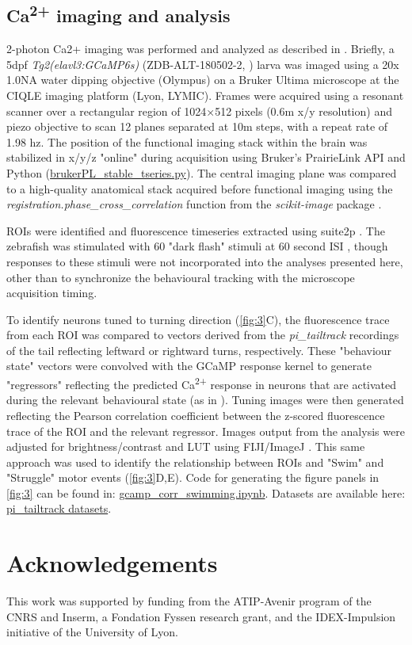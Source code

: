 \documentclass[9pt,lineno]{RandlettLab_elife}
\begin{document}
\subsection{Ca\textsuperscript{2+} imaging and analysis}

2-photon Ca2+ imaging was performed and analyzed as described in \citep{Lamire2023-di}. Briefly, a 5dpf \emph{Tg2(elavl3:GCaMP6s)} (ZDB-ALT-180502-2, \cite{Dunn2016-bg}) larva was imaged using a 20x 1.0NA water dipping objective (Olympus) on a Bruker Ultima microscope at the CIQLE imaging platform (Lyon, LYMIC). Frames were acquired using a resonant scanner over a rectangular region of 1024×512 pixels (0.6\micro m x/y resolution) and piezo objective to scan 12 planes separated at 10\micro m steps, with a repeat rate of 1.98 hz. The position of the functional imaging stack within the brain was stabilized in x/y/z "online" during acquisition using Bruker's PrairieLink API and Python (\href{https://github.com/owenrandlett/pi_tailtrack/blob/main/brukerPL_stable_tseries.py}{brukerPL\_stable\_tseries.py}). The central imaging plane was compared to a high-quality anatomical stack acquired before functional imaging using the \emph{ registration.phase\_cross\_correlation} function from the \emph{scikit-image} package \citep{van2014scikit}. 

ROIs were identified and fluorescence timeseries extracted using suite2p \citep{Pachitariu2016-tl}. The zebrafish was stimulated with 60 "dark flash" stimuli at 60 second ISI \citep{Lamire2023-di}, though responses to these stimuli were not incorporated into the analyses presented here, other than to synchronize the behavioural tracking with the microscope acquisition timing.


To identify neurons tuned to turning direction (\autoref{fig:3}C), the fluorescence trace from each ROI was compared to vectors derived from the \emph{pi\_tailtrack} recordings of the tail reflecting leftward or rightward turns, respectively. These "behaviour state" vectors were convolved with the GCaMP response kernel to generate "regressors" reflecting the predicted Ca\textsuperscript{2+} response in neurons that are activated during the relevant behavioural state (as in \cite{Miri2011-sr}). Tuning images were then generated reflecting the Pearson correlation coefficient between the z-scored fluorescence trace of the ROI and the relevant regressor. Images output from the analysis were adjusted for brightness/contrast and LUT using FIJI/ImageJ \citep{Schindelin2012-hd}. This same approach was used to identify the relationship between ROIs and "Swim" and "Struggle" motor events (\autoref{fig:3}D,E). Code for generating the figure panels in \autoref{fig:3} can be found in: \href{https://github.com/owenrandlett/pi_tailtrack/blob/main/gcamp_corr_swimming.ipynb}{gcamp\_corr\_swimming.ipynb}. Datasets are available here: \href{https://www.dropbox.com/sh/dbjq2dud1ws1o2v/AACLamthISys8sUD1a5oRcR1a?dl=0}{pi\_tailtrack datasets}. 

\section{Acknowledgements}

This work was supported by funding from the ATIP-Avenir program of the CNRS and Inserm, a Fondation Fyssen research grant, and the IDEX-Impulsion initiative of the University of Lyon.


\end{document}
